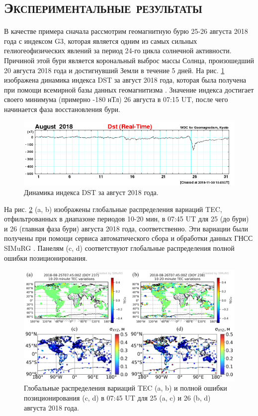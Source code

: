 \section{\textsc{Экспериментальные результаты}}

В качестве примера сначала рассмотрим геомагнитную бурю 25-26 августа 2018 года с индексом G3, которая является одним из самых сильных гелиогеофизических явлений за период 24-го цикла солнечной активности.
Причиной этой бури является корональный выброс массы Солнца, произошедший 20 августа 2018 года и достигнувший Земли в течение 5 дней.
На рис. \ref{fig-dst1808} изображена динамика индекса DST за август 2018 года, которая была получена при помощи всемирной базы данных геомагнитизма \cite{WDC}. 
Значение индекса достигает своего минимума (примерно -180 нТл) 26 августа в 07:15 UT, после чего начинается фаза восстановления бури.   
\begin{figure}[h]
\includegraphics[width=\textwidth]{fig/dst1808.png}    
\caption{Динамика индекса DST за август 2018 года.}
\label{fig-dst1808}      
\end{figure} 

На рис. \ref{fig-2018-237-238-07-45} (a, b) изображены глобальные распределения вариаций TEC, отфильтрованных в диапазоне периодов 10-20 мин, в 07:45 UT для 25 (до бури) и 26 (главная фаза бури) августа 2018 года, соответственно.
Эти вариации были получены при помощи сервиса автоматического сбора и обработки данных ГНСС SIMuRG \cite{Yasyukevich2020}.  
Панелям (c, d) соответствуют глобальные распределения полной ошибки позиционирования.   
\begin{figure}[h]
\includegraphics[width=\textwidth]{fig/2018-237-238-07-45.png}    
\caption{Глобальные распределения вариаций TEC (a, b) и полной ошибки позиционирования (c, d) в 07:45 UT для 25 (a, c) и 26 (b, d) августа 2018 года.}
\label{fig-2018-237-238-07-45}      
\end{figure} 

